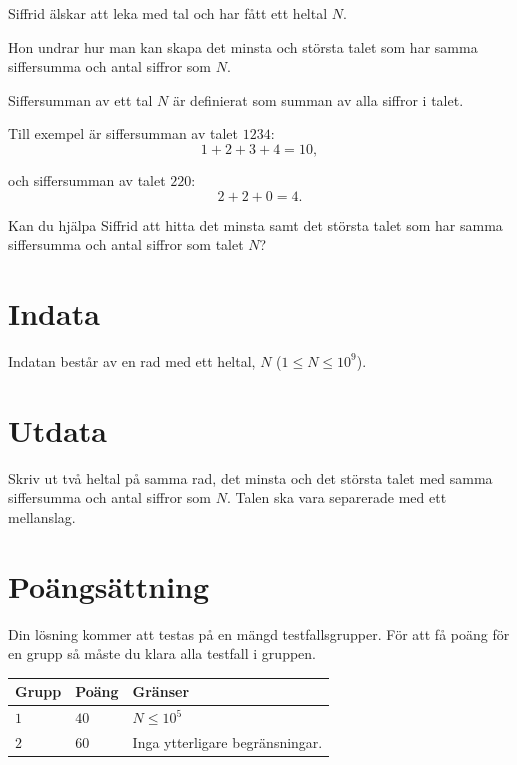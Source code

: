 \noindent
Siffrid älskar att leka med tal och har fått ett heltal $N$. 

Hon undrar hur man kan skapa det minsta och största talet som har samma siffersumma och antal siffror som $N$.

Siffersumman av ett tal $N$ är definierat som summan av alla siffror i talet. 

\noindent
Till exempel är siffersumman av talet $1234$: 
$$
1 + 2 + 3 + 4 = 10,
$$

och siffersumman av talet $220$:
$$
2 + 2 + 0 = 4.
$$

Kan du hjälpa Siffrid att hitta det minsta samt det största talet som har samma siffersumma och antal siffror som talet $N$?

\section*{Indata}
Indatan består av en rad med ett heltal, $N$ ($1 \le N \le 10^9$).

\section*{Utdata}
Skriv ut två heltal på samma rad, det minsta och det största talet med samma siffersumma och antal siffror som $N$.
Talen ska vara separerade med ett mellanslag.

\section*{Poängsättning}
Din lösning kommer att testas på en mängd testfallsgrupper.
För att få poäng för en grupp så måste du klara alla testfall i gruppen.

\noindent
\begin{tabular}{| l | l | p{12cm} |}
  \hline
  \textbf{Grupp} & \textbf{Poäng} & \textbf{Gränser} \\ \hline
  $1$    & $40$       & $N \leq 10^5$ \\ \hline
  $2$    & $60$       & Inga ytterligare begränsningar. \\ \hline
\end{tabular}

